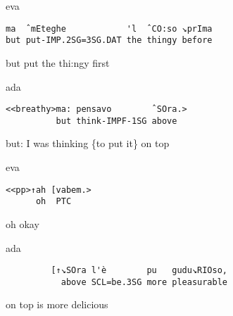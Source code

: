 \documentclass[output=paper,modfonts]{langscibook}
\begin{document}
\vspace{-1mm}
%
\begin{mdframednoverticalspace}[style=firstfoc]
\begin{transbox}{1}{eva}
\begin{verbatim}
ma  ˆmEteghe            'l  ˆCO:so ↘prIma
but put-IMP.2SG=3SG.DAT the thingy before
\end{verbatim}
but put the thi:ngy first
\end{transbox}
\end{mdframednoverticalspace}\vspace{1mm}
%
\begin{mdframednoverticalspace}[style=secondfoc]
\end{mdframednoverticalspace}\vspace{-0.5mm}
%
\begin{mdframednoverticalspace}[style=secondfoc]
\begin{transbox}{3}{ada}
\begin{verbatim}
<<breathy>ma: pensavo        ˆSOra.>
          but think-IMPF-1SG above
\end{verbatim}
\hspace{1.4cm} but: I was thinking \{to put it\} on top
\end{transbox}
\end{mdframednoverticalspace}\vspace{1mm}
%
\begin{transbox}{4}{eva}
\begin{verbatim}
<<pp>↑ah [vabem.>
      oh  PTC
\end{verbatim}
\hspace{0.8cm} oh okay
\end{transbox}
%
\begin{mdframednoverticalspace}[style=secondfoc]
\begin{transbox}{5}{ada}
\begin{verbatim}
         [↑↘SOra l'è        pu   gudu↘RIOso,
           above SCL=be.3SG more pleasurable
\end{verbatim}
\hspace{1.55cm} on top is more delicious
\end{transbox}
\end{mdframednoverticalspace}
\end{document}
